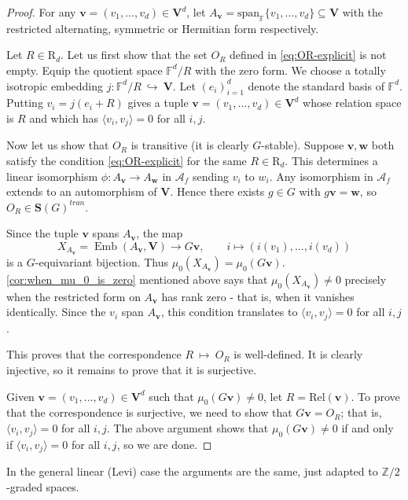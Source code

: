 \documentclass[11pt,a4paper]{amsart}
\theoremstyle{plain}%
\theoremstyle{definition}
\theoremstyle{remark}
\newcommand{\Span}{\mathrm{span}}
\newcommand{\V}{\mathbf{V}}
\newcommand{\F}{{\mathbb F}}
\newcommand{\Emb}{\operatorname{Emb}}
\newcommand{\Rel}{\mathrm{Rel}}
\newcommand{\Set}[1]{\mathbf{S}(#1)}
\begin{document}
\begin{proof} 
For any $\mathbf v=(v_1,\ldots,v_d)\in\mathbf V^d$, let $A_{\mathbf v} = \Span_{\F}\{v_1,\ldots,v_d\} \subseteq \mathbf{V}$ with the restricted alternating, symmetric or Hermitian form respectively.

Let $R\in \mathrm{R}_d$. Let us first show that the set $O_R$ defined in \eqref{eq:OR-explicit} is not empty. Equip the quotient space $\F^d/R$ with the zero form. We choose a totally isotropic embedding $ j:\F^d/R~\hookrightarrow~\mathbf V.$ 
 Let $(e_i)_{i=1}^d$ denote the standard basis of $\F^d$. Putting $v_i=j(e_i+R)$ gives a tuple $\mathbf v=(v_1,\ldots,v_d)\in\mathbf V^d$ whose relation space is $R$ and which has $\langle v_i,v_j\rangle=0$ for all $i,j$.

Now let us show that $O_R$ is transitive (it is clearly $G$-stable). Suppose $\mathbf v,\mathbf w$ both satisfy the condition \eqref{eq:OR-explicit} for the same $R\in \mathrm{R}_d$. This determines a linear isomorphism $\phi:A_{\mathbf v}\to A_{\mathbf w}$ in $\mathcal{A}_f$ sending $v_i$ to $w_i$. Any isomorphism in $\mathcal{A}_f$ extends to an automorphism of $\mathbf{V}$. Hence there exists $g\in G$ with $g\mathbf v=\mathbf w$, so $O_R \in \Set{G}^{tran}$. 


Since the tuple $\mathbf v$ spans $A_{\mathbf v}$, the map
\[
 X_{A_{\mathbf v}}=\Emb(A_{\mathbf v},\mathbf V)
 \longrightarrow G\mathbf v,
 \qquad
 i\longmapsto(i(v_1),\ldots,i(v_d))
\]
is a $G$-equivariant bijection. Thus $\mu_0( X_{A_{\mathbf v}})=\mu_0(G\mathbf v)$. \cref{cor:when_mu_0_is_zero} mentioned above says that $\mu_0( X_{A_{\mathbf v}}){\neq} 0$ precisely when the restricted form on $A_{\mathbf v}$ has rank zero - that is, when it vanishes identically. Since the $v_i$ span $A_{\mathbf v}$, this condition translates to $\langle v_i,v_j\rangle=0$ for all $i,j$.

This proves that the correspondence $R~\mapsto~ O_R$ is well-defined. It is clearly injective, so it remains to prove that it is surjective.

Given $\mathbf v=(v_1,\ldots,v_d)\in  \V^{d}$ such that $\mu_0(G\mathbf v)\neq 0$, let $R=\Rel(\mathbf v)$. To prove that the correspondence is surjective, we need to show that $G\mathbf v=O_R$; that is, $\langle v_i,v_j\rangle=0$ for all $i,j$. The above argument shows that $\mu_0(G\mathbf v)\neq 0$ if and only if $\langle v_i,v_j\rangle=0$ for all $i,j$, so we are done.

\end{proof}
    In the general linear (Levi) case the arguments are the same, just adapted to $\mathbb{Z}/2$-graded spaces. 
   
\end{document}
